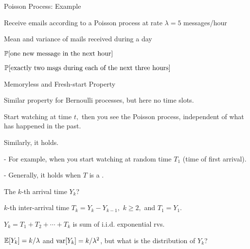 \begin{frame}{Poisson Process: Example}

\plitemsep 0.15in
\bci
\item Receive emails according to a Poisson process at rate $\lambda =5$ messages/hour

\item Mean and variance of mails received during a day


\item $\mathbb{P}[ \text{one new message in the next hour} ]$


\item $\mathbb{P}[ \text{exactly two msgs during each of the next three hours} ]$

\eci
\end{frame}

\begin{frame}{Memoryless and Fresh-start Property}

\plitemsep 0.1in
\bci
\item {} Similar property for Bernoulli processes, but here no time slots.

\item<2->  Start watching at time $t,$ then you see the Poisson process, independent of what has happened in the past.

\item<3->  Similarly, it
  holds.

  - For example, when you start watching at random time $T_1$
  (time of first arrival).

  - Generally, it holds when $T$ is a . 

\item<4->[\redf{(Q3)}] The $k$-th arrival time $Y_k$?

\item<5-> $k$-th inter-arrival time $T_k = Y_k - Y_{k-1},$ $k\ge 2,$ and $T_1 = Y_1.$

\item<6-> $Y_k = T_1 + T_2 + \cdots + T_k$ is sum of i.i.d. exponential rvs.

\item<7-> $\mathbb{E}[ Y_k ] = k/\lambda$ and $\text{var}[ Y_k ] = k/\lambda^2$,
  but what is the distribution of $Y_k$?
\eci
\end{frame}

